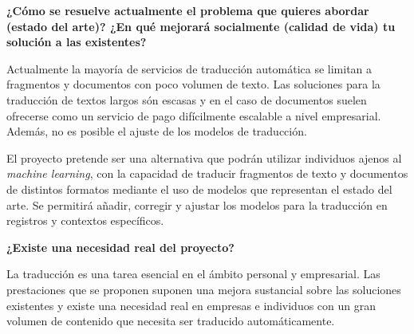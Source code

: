\textbf{¿Cómo se resuelve actualmente el problema que quieres abordar (estado del arte)?
¿En qué mejorará socialmente (calidad de vida) tu solución a las existentes?}

Actualmente la mayoría de servicios de traducción automática se limitan a fragmentos y documentos
con poco volumen de texto. Las soluciones para la traducción de textos largos
són escasas y en el caso de documentos suelen ofrecerse
como un servicio de pago difícilmente escalable a nivel empresarial. Además, no es posible
el ajuste de los modelos de traducción.

El proyecto pretende ser una alternativa que podrán utilizar individuos ajenos al \textit{machine learning},
con la capacidad de traducir fragmentos de texto y documentos de distintos formatos mediante
el uso de modelos que representan el estado del arte.
Se permitirá añadir, corregir y ajustar los modelos para la traducción en registros y contextos
específicos.

\textbf{¿Existe una necesidad real del proyecto?}

La traducción es una tarea esencial en el ámbito personal y empresarial. Las prestaciones que se proponen
suponen una mejora sustancial sobre las soluciones existentes y existe una necesidad real en empresas
e individuos con un gran volumen de contenido que necesita ser traducido automáticamente.
 